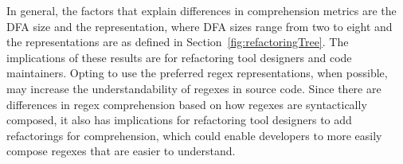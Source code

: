 In general, the factors that explain differences in comprehension metrics are the DFA size  and the representation, where DFA sizes range from two to eight and the representations are as defined in Section~\ref{fig:refactoringTree}. 
The implications of these results are for refactoring tool designers and code maintainers. Opting to use the preferred regex representations, when possible, may increase the understandability of regexes in source code.
Since there are differences in regex comprehension based on how regexes are syntactically composed, it also has implications for refactoring tool designers to add refactorings for comprehension, which could enable developers to more easily compose regexes that are easier to understand. 
%
%
%
%
